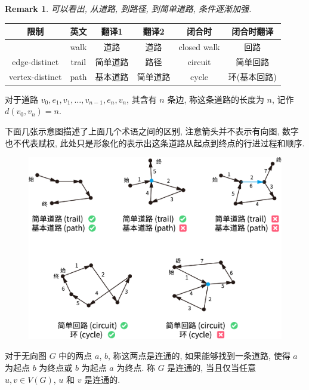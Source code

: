 \documentclass[UTF8]{ctexart}
\theoremstyle{mystyle}
\theoremstyle{myremark}
\newtheorem*{remark}{Remark}
\theoremstyle{plain}
\begin{document}
\begin{remark}
    可以看出, 从道路, 到路径, 到简单道路, 条件逐渐加强. 
\end{remark}

\begin{table}[H]
    \centering
    \begin{tabular}{c|ccc|cc}
        限制 & 英文 & 翻译1 & 翻译2 & 闭合时 & 闭合时翻译 \\ \hline
            & walk & 道路 & 道路 & closed walk & 回路 \\ \hline
        edge-distinct & trail & 简单道路 & 路径 & circuit & 简单回路 \\ \hline
        vertex-distinct & path & 基本道路 & 简单道路 & cycle & 环(基本回路)
    \end{tabular}
\end{table}

对于道路 $ v_0, e_1, v_1, \dots, v_{n - 1}, e_n, v_n $, 其含有 $ n $ 条边, 称这条道路的长度为 $ n $, 记作 $ d(v_0, v_n) = n $.

下面几张示意图描述了上面几个术语之间的区别, 注意箭头并不表示有向图, 数字也不代表赋权, 此处只是形象化的表示出这条道路从起点到终点的行进过程和顺序.
\begin{figure}[H]
    \centering
    \includegraphics[width = 0.9\linewidth]{./images/walks.png}
\end{figure}


\begin{definition}[\text{连通}]
    对于无向图 $ G $ 中的两点 $ a $, $ b $, 称这两点是连通的, 如果能够找到一条道路, 使得 $ a $ 为起点 $ b $ 为终点或 $ b $ 为起点 $ a $ 为终点. 称 $ G $ 是连通的, 当且仅当任意 $ u, v \in V(G) $, $ u $ 和 $ v $ 是连通的.
\end{definition}
\end{document}
